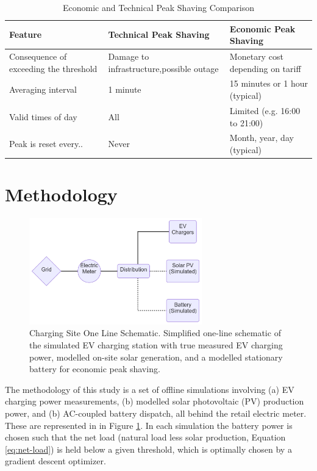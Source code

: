 \documentclass[journal,article,submit,pdftex,moreauthors]{Definitions/mdpi}
\begin{document}
\begin{table}
    \centering
    \caption{Economic and Technical Peak Shaving Comparison}
    \label{tab:econ-tech-peak-shaving}
    \begin{tabularx}{\textwidth}{XXX}
    \toprule
    Feature & Technical Peak Shaving & Economic Peak Shaving  \\
    \midrule
    Consequence of exceeding the threshold & Damage to infrastructure,possible outage & Monetary cost depending on tariff \\
    Averaging interval                     & 1 minute                                 & 15 minutes or 1 hour (typical) \\
    Valid times of day                     & All                                      & Limited (e.g. 16:00 to 21:00) \\
    Peak is reset every..                  & Never                                    & Month, year, day (typical) \\
    \bottomrule
    \end{tabularx}
\end{table}


\section{Methodology}\label{methodology}%

\begin{figure}
  \centering
  \includegraphics[width=7.5cm]{./images/oneline.png}
  \caption{Charging Site One Line Schematic. Simplified
  one-line schematic of the simulated EV charging station with true
  measured EV charging power, modelled on-site solar generation, and a
  modelled stationary battery for economic peak shaving.}
  \label{fig:oneline}
\end{figure}

The methodology of this study is a set of offline simulations involving
(a) EV charging power measurements, (b) modelled solar photovoltaic (PV)
production power, and (b) AC-coupled battery dispatch, all behind the
retail electric meter. These are represented in in Figure \ref{fig:oneline}.
In each simulation the battery power is chosen
such that the net load (natural load less solar production, Equation \ref{eq:net-load}) is held
below a given threshold, which is optimally chosen by a gradient descent
optimizer.
\end{document}
